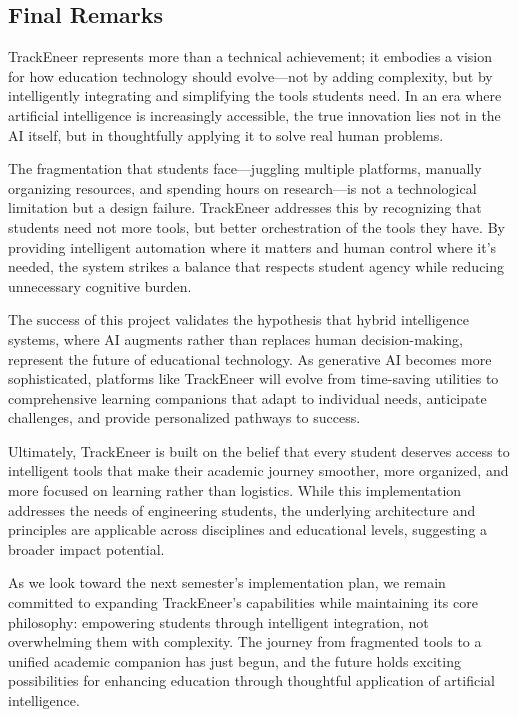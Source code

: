\documentclass[12pt]{article}
\begin{document}
\subsection{Final Remarks}
TrackEneer represents more than a technical achievement; it embodies a vision for how education technology should evolve—not by adding complexity, but by intelligently integrating and simplifying the tools students need. In an era where artificial intelligence is increasingly accessible, the true innovation lies not in the AI itself, but in thoughtfully applying it to solve real human problems.

The fragmentation that students face—juggling multiple platforms, manually organizing resources, and spending hours on research—is not a technological limitation but a design failure. TrackEneer addresses this by recognizing that students need not more tools, but better orchestration of the tools they have. By providing intelligent automation where it matters and human control where it's needed, the system strikes a balance that respects student agency while reducing unnecessary cognitive burden.

The success of this project validates the hypothesis that hybrid intelligence systems, where AI augments rather than replaces human decision-making, represent the future of educational technology. As generative AI becomes more sophisticated, platforms like TrackEneer will evolve from time-saving utilities to comprehensive learning companions that adapt to individual needs, anticipate challenges, and provide personalized pathways to success.

Ultimately, TrackEneer is built on the belief that every student deserves access to intelligent tools that make their academic journey smoother, more organized, and more focused on learning rather than logistics. While this implementation addresses the needs of engineering students, the underlying architecture and principles are applicable across disciplines and educational levels, suggesting a broader impact potential.

As we look toward the next semester's implementation plan, we remain committed to expanding TrackEneer's capabilities while maintaining its core philosophy: empowering students through intelligent integration, not overwhelming them with complexity. The journey from fragmented tools to a unified academic companion has just begun, and the future holds exciting possibilities for enhancing education through thoughtful application of artificial intelligence.
\end{document}
